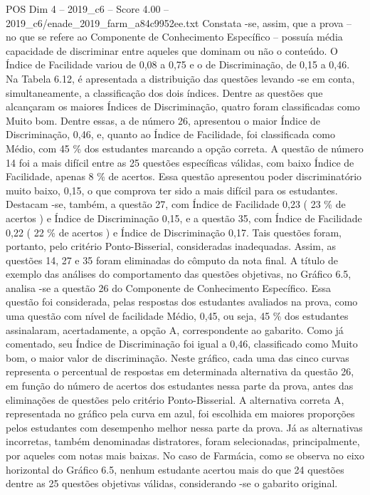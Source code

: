 \begin{textsample}{POS Dim 4 – 2019\_c6 – Score 4.00 – 2019\_c6/enade\_2019\_farm\_a84c9952ee.txt}
Constata -se, assim, que a prova – no que se refere ao Componente de Conhecimento Específico – possuía média capacidade de discriminar entre aqueles que dominam ou não o conteúdo.
O Índice de Facilidade variou de 0,08 a 0,75 e o de Discriminação, de 0,15 a 0,46.
Na Tabela 6.12, é apresentada a distribuição das questões levando -se em conta, simultaneamente, a classificação dos dois índices.
Dentre as questões que alcançaram os maiores Índices de Discriminação, quatro foram classificadas como Muito bom.
Dentre essas, a de número 26, apresentou o maior Índice de Discriminação, 0,46, e, quanto ao Índice de Facilidade, foi classificada como Médio, com 45 \% dos estudantes marcando a opção correta.
A questão de número 14 foi a mais difícil entre as 25 questões específicas válidas, com baixo Índice de Facilidade, apenas 8 \% de acertos.
Essa questão apresentou poder discriminatório muito baixo, 0,15, o que comprova ter sido a mais difícil para os estudantes.
Destacam -se, também, a questão 27, com Índice de Facilidade 0,23 ( 23 \% de acertos ) e Índice de Discriminação 0,15, e a questão 35, com Índice de Facilidade 0,22 ( 22 \% de acertos ) e Índice de Discriminação 0,17.
Tais questões foram, portanto, pelo critério Ponto-Bisserial, consideradas inadequadas.
Assim, as questões 14, 27 e 35 foram eliminadas do cômputo da nota final.
A título de exemplo das análises do comportamento das questões objetivas, no Gráfico 6.5, analisa -se a questão 26 do Componente de Conhecimento Específico.
Essa questão foi considerada, pelas respostas dos estudantes avaliados na prova, como uma questão com nível de facilidade Médio, 0,45, ou seja, 45 \% dos estudantes assinalaram, acertadamente, a opção A, correspondente ao gabarito.
Como já comentado, seu Índice de Discriminação foi igual a 0,46, classificado como Muito bom, o maior valor de discriminação.
Neste gráfico, cada uma das cinco curvas representa o percentual de respostas em determinada alternativa da questão 26, em função do número de acertos dos estudantes nessa parte da prova, antes das eliminações de questões pelo critério Ponto-Bisserial.
A alternativa correta A, representada no gráfico pela curva em azul, foi escolhida em maiores proporções pelos estudantes com desempenho melhor nessa parte da prova.
Já as alternativas incorretas, também denominadas distratores, foram selecionadas, principalmente, por aqueles com notas mais baixas.
No caso de Farmácia, como se observa no eixo horizontal do Gráfico 6.5, nenhum estudante acertou mais do que 24 questões dentre as 25 questões objetivas válidas, considerando -se o gabarito original.

\end{textsample}
